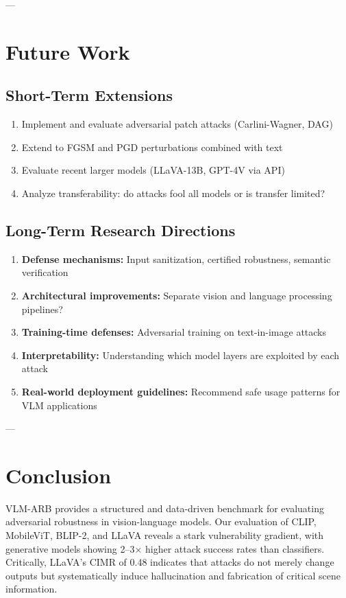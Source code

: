 \documentclass[11pt]{article}
\begin{document}
---

\section{Future Work}

\subsection{Short-Term Extensions}

\begin{enumerate}[leftmargin=2em]
    \item Implement and evaluate adversarial patch attacks (Carlini-Wagner, DAG)
    \item Extend to FGSM and PGD perturbations combined with text
    \item Evaluate recent larger models (LLaVA-13B, GPT-4V via API)
    \item Analyze transferability: do attacks fool all models or is transfer limited?
\end{enumerate}

\subsection{Long-Term Research Directions}

\begin{enumerate}[leftmargin=2em]
    \item \textbf{Defense mechanisms:} Input sanitization, certified robustness, semantic verification
    \item \textbf{Architectural improvements:} Separate vision and language processing pipelines?
    \item \textbf{Training-time defenses:} Adversarial training on text-in-image attacks
    \item \textbf{Interpretability:} Understanding which model layers are exploited by each attack
    \item \textbf{Real-world deployment guidelines:} Recommend safe usage patterns for VLM applications
\end{enumerate}

---

\section{Conclusion}

VLM-ARB provides a structured and data-driven benchmark for evaluating adversarial robustness in vision-language models. Our evaluation of CLIP, MobileViT, BLIP-2, and LLaVA reveals a stark vulnerability gradient, with generative models showing 2--3× higher attack success rates than classifiers. Critically, LLaVA's CIMR of 0.48 indicates that attacks do not merely change outputs but systematically induce hallucination and fabrication of critical scene information.
\end{document}
